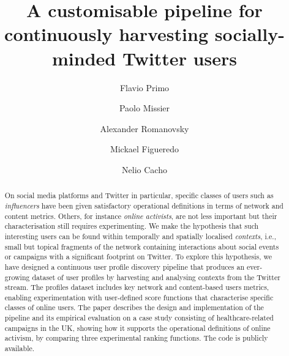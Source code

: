 \documentclass[runningheads]{llncs}
\begin{document}
    \title{A customisable pipeline for continuously harvesting socially-minded Twitter users}
    \author{Flavio Primo \and
    Paolo Missier \and
    Alexander Romanovsky \and
    Mickael Figueredo \and
    Nelio Cacho}
    
    \maketitle       %
    
    \begin{abstract}
    	On social media platforms and Twitter in particular, specific classes of users such as \textit{influencers}  have been given satisfactory operational definitions in terms of  network and content metrics.
    	Others, for instance \textit{online activists}, are not less important but their characterisation still requires experimenting.
    	We make  the hypothesis that such interesting users can be found within temporally and spatially localised \textit{contexts}, i.e., small but topical fragments of the network containing interactions about social events or campaigns with a significant footprint on Twitter.
    	To explore this hypothesis, we have designed a continuous user profile discovery pipeline that produces an ever-growing dataset of user profiles by harvesting and analysing contexts from the Twitter stream.
    	The profiles dataset includes key network and content-based users metrics, enabling experimentation with user-defined score functions that characterise specific classes of online users.
        The paper describes the design and implementation of  the pipeline and its empirical evaluation on a case study consisting of healthcare-related campaigns in the UK, showing how it supports the operational definitions of online activism, by comparing three experimental ranking functions. The code is publicly available.
    	
    \end{abstract}
    
\end{document}
